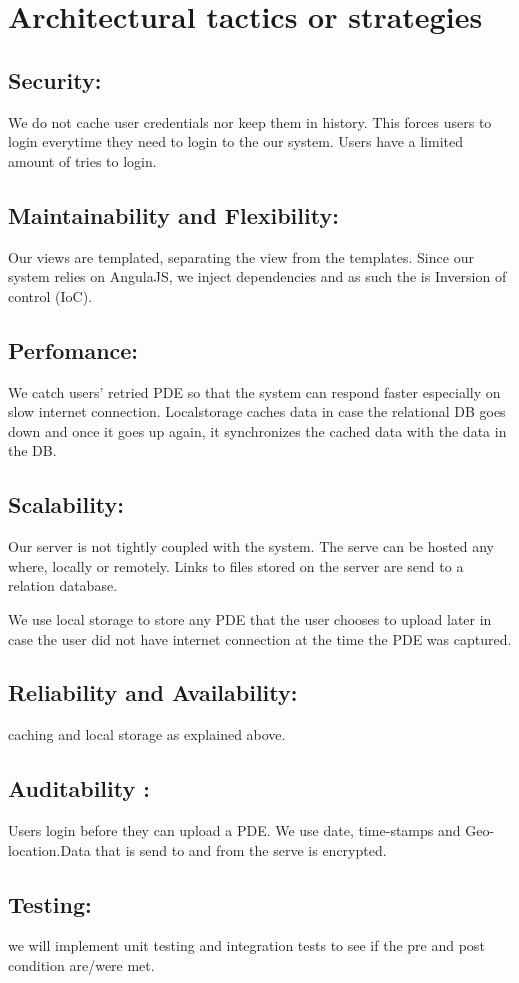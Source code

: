 \documentclass[a4paper,12pt]{article}
\begin{document}
\section{Architectural tactics or strategies}
\subsection{Security:} We do not cache user credentials nor keep them in history. This forces users to login everytime they need to login to the our system.  Users have a limited amount of tries to login. 
\subsection{Maintainability and Flexibility:} Our views are templated, separating the view from the templates. Since our system relies on AngulaJS, we inject dependencies and as such the is Inversion of control (IoC).
\subsection{Perfomance:} We catch users' retried PDE so that the system can respond faster especially on slow internet connection. Localstorage caches data in case the relational DB goes down and once it goes up again, it synchronizes the cached data with the data in the DB.
\subsection{Scalability:} Our server is not tightly coupled with the system. The serve can be hosted any where, locally or remotely. Links to files stored on the server are send to a relation database.

We use local storage to store any PDE that the user chooses to upload later in case the user did not have internet connection at the time the PDE was captured.
\subsection{Reliability and Availability:} caching and local storage as explained above.
\subsection{Auditability :} Users login before they can upload a PDE. We use date, time-stamps and Geo-location.Data that is send to and from the serve is encrypted.
\subsection{Testing:}we will implement unit testing and integration tests to see if the pre and post condition are/were met.
\end{document}
